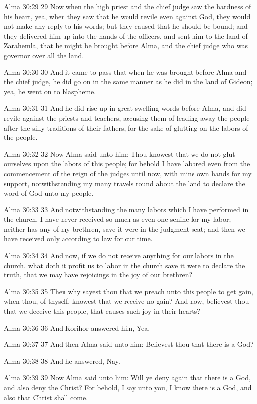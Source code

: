 Alma 30:29
 29 Now when the high priest and the chief judge saw the hardness
of his heart, yea, when they saw that he would revile even
against God, they would not make any reply to his words; but they
caused that he should be bound; and they delivered him up into
the hands of the officers, and sent him to the land of Zarahemla,
that he might be brought before Alma, and the chief judge who was
governor over all the land.

Alma 30:30
 30 And it came to pass that when he was brought before Alma and
the chief judge, he did go on in the same manner as he did in the
land of Gideon; yea, he went on to blaspheme.

Alma 30:31
 31 And he did rise up in great swelling words before Alma, and
did revile against the priests and teachers, accusing them of
leading away the people after the silly traditions of their
fathers, for the sake of glutting on the labors of the people.

Alma 30:32
 32 Now Alma said unto him: Thou knowest that we do not glut
ourselves upon the labors of this people; for behold I have
labored even from the commencement of the reign of the judges
until now, with mine own hands for my support, notwithstanding my
many travels round about the land to declare the word of God unto
my people.

Alma 30:33
 33 And notwithstanding the many labors which I have performed in
the church, I have never received so much as even one senine for
my labor; neither has any of my brethren, save it were in the
judgment-seat; and then we have received only according to law
for our time.

Alma 30:34
 34 And now, if we do not receive anything for our labors in the
church, what doth it profit us to labor in the church save it
were to declare the truth, that we may have rejoicings in the joy
of our brethren?

Alma 30:35
 35 Then why sayest thou that we preach unto this people to get
gain, when thou, of thyself, knowest that we receive no gain?
And now, believest thou that we deceive this people, that causes
such joy in their hearts?

Alma 30:36
 36 And Korihor answered him, Yea.

Alma 30:37
 37 And then Alma said unto him: Believest thou that there is a
God?

Alma 30:38
 38 And he answered, Nay.

Alma 30:39
 39 Now Alma said unto him: Will ye deny again that there is a
God, and also deny the Christ? For behold, I say unto you, I
know there is a God, and also that Christ shall come.

